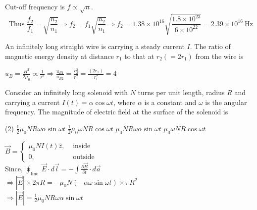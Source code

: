 \begin{enumerate}
\begin{minipage}{\textwidth}
	\end{minipage}
	\begin{answer}
		Cut-off frequency is $f \propto \sqrt{n}$.
		$$
		\text { Thus } \frac{f_{2}}{f_{1}}=\sqrt{\frac{n_{2}}{n_{1}}} \Rightarrow f_{2}=f_{1} \sqrt{\frac{n_{2}}{n_{1}}} \Rightarrow f_{2}=1.38 \times 10^{16} \sqrt{\frac{1.8 \times 10^{23}}{6 \times 10^{22}}}=2.39 \times 10^{16} \mathrm{~Hz}
		$$	
	\end{answer}
	\begin{minipage}{\textwidth}
		\item An infinitely long straight wire is carrying a steady current $I$. The ratio of magnetic energy density at distance $r_{1}$ to that at $r_{2}\left(=2 r_{1}\right)$ from the wire is
	\end{minipage}
	\begin{answer}
		$u_{B}=\frac{B^{2}}{2 \mu_{0}} \propto \frac{1}{r^{2}} \Rightarrow \frac{u_{B 1}}{u_{B 2}}=\frac{r_{2}^{2}}{r_{1}^{2}}=\frac{\left(2 r_{1}\right)}{r_{1}^{2}}=4$	
	\end{answer}
	\begin{minipage}{\textwidth}
		\item Consider an infinitely long solenoid with $N$ turns per unit length, radius $R$ and carrying a current $I(t)=\alpha \cos \omega t$, where $\alpha$ is a constant and $\omega$ is the angular frequency. The magnitude of electric field at the surface of the solenoid is
	\end{minipage}
	\begin{tasks}(2)
		\task[\textbf{A.}] $\frac{1}{2} \mu_{0} N R \omega \alpha \sin \omega t$
		\task[\textbf{B.}]$\frac{1}{2} \mu_{0} \omega N R \cos \omega t$
		\task[\textbf{C.}]$\mu_{0} N R \omega \alpha \sin \omega t$
		\task[\textbf{D.}]$\mu_{0} \omega N R \cos \omega t$
	\end{tasks}
	\begin{answer}
		$\vec{B}= \begin{cases}\mu_{0} N I(t) \hat{z}, & \text { inside } \\ 0, & \text { outside }\end{cases}$\\
		Since, $\oint_{\text {line }} \vec{E} \cdot d \vec{l}=-\int \frac{\partial \vec{B}}{\partial t} \cdot d \vec{a}$\\
		$\Rightarrow|\vec{E}| \times 2 \pi R=-\mu_{0} N(-\alpha \omega \sin \omega t) \times \pi R^{2}$\\
		$\Rightarrow|\vec{E}|=\frac{1}{2} \mu_{0} N R \omega \alpha \sin \omega t$\\

\end{answer}
\end{enumerate}
